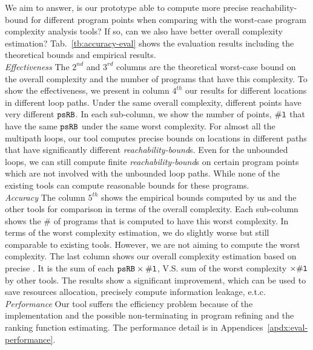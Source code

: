 We aim to answer, is our prototype able to compute more precise reachability-bound for different program points when comparing with the worst-case program
complexity analysis tools? If so, can we also have better overall complexity estimation?
Tab.~\ref{tb:accuracy-eval} shows the evaluation results including the theoretical bounds and empirical results.
\\
\emph{Effectiveness}
\newcommand{\pointnum}{\kw{\# l}}
The $2^{nd}$ and $3^{rd}$ columns are the theoretical worst-case bound on the overall complexity and the number of programs that have this complexity.
To show the effectiveness, 
we present in column $4^{th}$ our results for different locations in different loop paths. 
Under the same overall complexity, different points have very different $\mathtt{psRB}$.
In each sub-column, we show the number of points, $\pointnum$ that have the same $\mathtt{psRB}$ under the same worst complexity.
For almost all the multipath loops, our tool computes precise bounds on locations in different paths that have significantly different \emph{reachability-bound}s.
Even for the unbounded loops, we can still compute finite \emph{reachability-bound}s on certain program points which are not involved with the unbounded loop paths.
While none of the existing tools can compute reasonable bounds for these programs.
\\
\emph{Accuracy} 
The column $5^{th}$ shows the empirical bounds computed by us and the other tools for comparison in terms of the overall complexity. Each sub-column shows the $\#$ of programs that is computed to have this worst complexity.
In terms of the worst complexity estimation, we do slightly worse but still comparable to existing tools. However, we are not aiming to compute the worst complexity.
The last column shows our overall complexity estimation based on precise {\THESYSTEM}.
It is the sum of each $\psRB \times \pointnum$, V.S. sum of the worst complexity $\times \pointnum$  by other tools.
The results show a significant improvement, which can be used to save resources allocation,
precisely compute information leakage, e.t.c.
\\
\emph{Performance}
Our tool suffers the efficiency problem because of the implementation and the possible non-terminating in program refining and the ranking function estimating.
The performance detail is in Appendices~\ref{apdx:eval-performance}.
